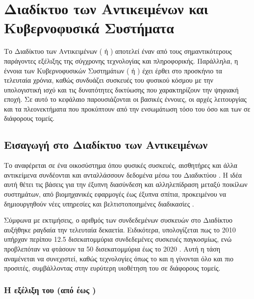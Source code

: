 
\chapter{Διαδίκτυο των Αντικειμένων και Κυβερνοφυσικά Συστήματα}\label{ch:iot}

Το Διαδίκτυο των Αντικειμένων ( ή ) αποτελεί έναν από τους σημαντικότερους παράγοντες εξέλιξης της σύγχρονης τεχνολογίας και πληροφορικής. Παράλληλα, η έννοια των Κυβερνοφυσικών Συστημάτων ( ή ) έχει έρθει στο προσκήνιο τα τελευταία χρόνια, καθώς συνδυάζει συσκευές του φυσικού κόσμου με την υπολογιστική ισχύ και τις δυνατότητες δικτύωσης που χαρακτηρίζουν την ψηφιακή εποχή. Σε αυτό το κεφάλαιο παρουσιάζονται οι βασικές έννοιες, οι αρχές λειτουργίας και τα πλεονεκτήματα που προκύπτουν από την ενσωμάτωση τόσο του  όσο και των  σε διάφορους τομείς.

\section{Εισαγωγή στο Διαδίκτυο των Αντικειμένων}

Το  αναφέρεται σε ένα οικοσύστημα όπου φυσικές συσκευές,
αισθητήρες και άλλα αντικείμενα συνδέονται και ανταλλάσσουν δεδομένα μέσω του Διαδικτύου
\cite{gubbi_internet_2013}. Η ιδέα αυτή θέτει τις βάσεις για την έξυπνη διασύνδεση και
αλληλεπίδραση μεταξύ ποικίλων συστημάτων, από βιομηχανικές εφαρμογές έως έξυπνα σπίτια,
προκειμένου να δημιουργηθούν νέες υπηρεσίες και βελτιστοποιημένες διαδικασίες
\cite{weber_internet_2010}.

Σύμφωνα με εκτιμήσεις, ο αριθμός των συνδεδεμένων συσκευών στο Διαδίκτυο αυξήθηκε
ραγδαία την τελευταία δεκαετία. Ειδικότερα, υπολογίζεται πως το 2010 υπήρχαν περίπου
12.5 δισεκατομμύρια συνδεδεμένες συσκευές παγκοσμίως, ενώ προβλεπόταν να φτάσουν τα
50 δισεκατομμύρια έως το 2020 \cite{Evans2011}. Αυτή η τάση αναμένεται να συνεχιστεί,
καθώς τεχνολογίες όπως το  και η  γίνονται
όλο και πιο προσιτές, συμβάλλοντας στην ευρύτερη υιοθέτηση του  σε διάφορους τομείς.

\subsection*{Η εξέλιξη του  (από  έως )}

